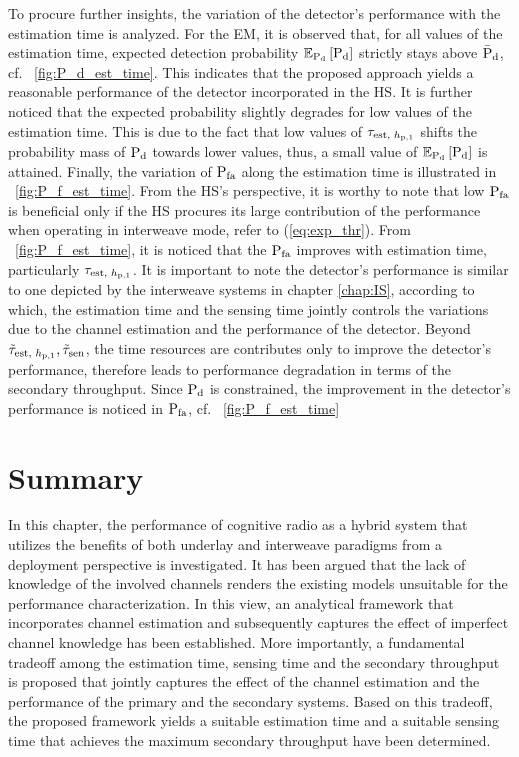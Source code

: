 To procure further insights, the variation of the detector's performance with the estimation time is analyzed. For the EM, it is observed that, for all values of the estimation time, expected detection probability ${\mathbb E}_{\text{P}_{\text{d}}}\left[ \text{P}_{\text{d}} \right]$ strictly stays above $\bar{\text{P}}_{\text{d}}$, cf. \figurename~\ref{fig:P_d_est_time}. This indicates that the proposed approach yields a reasonable performance of the detector incorporated in the HS. It is further noticed that the expected probability slightly degrades for low values of the estimation time. This is due to the fact that low values of $\tau_{\text{est, $h_{\text{p,1}}$}}$ shifts the probability mass of $\text{P}_{\text{d}}$ towards lower values, thus, a small value of ${\mathbb E}_{\text{P}_{\text{d}}}\left[ \text{P}_{\text{d}} \right]$ is attained. 
Finally, the variation of $\text{P}_{\text{fa}}$ along the estimation time is illustrated in \figurename~\ref{fig:P_f_est_time}. From the HS's perspective, it is worthy to note that low $\text{P}_{\text{fa}}$ is beneficial only if the HS procures its large contribution of the performance when operating in interweave mode, refer to (\ref{eq:exp_thr}). From \figurename~\ref{fig:P_f_est_time}, it is noticed that the $\text{P}_{\text{fa}}$ improves with estimation time, particularly $\tau_{\text{est, $h_{\text{p,1}}$}}$. It is important to note the detector's performance is similar to one depicted by the interweave systems in chapter \ref{chap:IS}, according to which, the estimation time and the sensing time jointly controls the variations due to the channel estimation and the performance of the detector. Beyond $\tilde{\tau}_{\text{est, $h_{\text{p,1}}$}}, \tilde{\tau}_{\text{sen}}$, the time resources are contributes only to improve the detector's performance, therefore leads to performance degradation in terms of the secondary throughput. Since $\text{P}_{\text{d}}$ is constrained, the improvement in the detector's performance is noticed in $\text{P}_{\text{fa}}$, cf. \figurename~\ref{fig:P_f_est_time} 

\section{Summary} \label{sec:conc}
In this chapter, the performance of cognitive radio as a hybrid system that utilizes the benefits of both underlay and interweave paradigms from a deployment perspective is investigated. It has been argued that the lack of knowledge of the involved channels renders the existing models unsuitable for the performance characterization. In this view, an analytical framework that incorporates channel estimation and subsequently captures the effect of imperfect channel knowledge has been established. More importantly, a fundamental tradeoff among the estimation time, sensing time and the secondary throughput is proposed that jointly captures the effect of the channel estimation and the performance of the primary and the secondary systems. Based on this tradeoff, the proposed framework yields a suitable estimation time and a suitable sensing time that achieves the maximum secondary throughput have been determined. %

